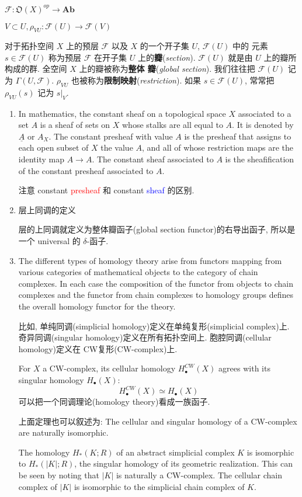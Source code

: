 \documentclass{ctexart}
\newcommand{\F}{\mathscr{F}}
\newcommand{\NBR}[1]{\mathfrak{O}(#1)}
\begin{document}
$\F \colon \NBR{X}^{op} \to \mathbf{A\!b}$

$V \subset U, \rho_{VU} : \F(U) \to \F(V)$

对于拓扑空间 $X$ 上的预层 $\F$ 以及 $X$ 的一个开子集 $U$, $\F(U)$ 中的
元素 $s \in \F(U)$ 称为预层 $\F$ 在开子集 $U$ 上的\textbf{瓣}(\textit{section}). $\F(U)$
就是由 $U$ 上的瓣所构成的群. 全空间 $X$ 上的瓣被称为\textbf{整体
  瓣}(\textit{global section}). 我们往往把 $\F(U)$ 记为 $\Gamma(U,
\F)$. $\rho_{VU}$ 也被称为\textbf{限制映射}(\textit{restriction}). 如果 $s \in
\F(U)$, 常常把 $\rho_{VU}(s)$ 记为 $s|_{V}$.

\begin{enumerate}
\item In mathematics, the constant sheaf on a topological space $X$ associated to a set $A$ is a sheaf of sets on $X$ whose stalks are all equal to $A$. It is denoted by $\underline{A}$ or $A_X$. The constant presheaf with value $A$ is the presheaf that assigns to each open subset of $X$ the value $A$, and all of whose restriction maps are the identity map $A\to A$. The constant sheaf associated to $A$ is the sheafification of the constant presheaf associated to $A$.\cite{constant_sheaf}

    注意 constant \textcolor{red}{presheaf} 和 constant \textcolor{blue}{sheaf} 的区别.

\item 层上同调的定义

层的上同调就定义为整体瓣函子(global section functor)的右导出函子, 所以是一个 universal 的 $\delta$-函子.

\item The different types of homology theory arise from functors mapping from various categories of mathematical objects to the category of chain complexes. In each case the composition of the functor from objects to chain complexes and the functor from chain complexes to homology groups defines the overall homology functor for the theory.

比如, 单纯同调(simplicial homology)定义在单纯复形(simplicial complex)上. 奇异同调(singular homology)定义在所有拓扑空间上. 胞腔同调(cellular homology)定义在 CW复形(CW-complex)上.

For $X$ a CW-complex, its cellular homology $H^{CW}_\bullet(X)$ agrees with its singular homology $H_\bullet(X)$:
\[
H^{CW}_\bullet(X)\simeq H_\bullet(X)
\]
可以把一个同调理论(homology theory)看成一族函子.

上面定理也可以叙述为: The cellular and singular homology of a CW-complex are naturally isomorphic.

The homology $H_\ast(K;R)$ of an abstract simplicial complex $K$ is isomorphic to $H_\ast(\left|K\right|;R)$, the singular homology of its geometric realization. This can be seen by noting that $\left|K\right|$ is naturally a CW-complex. The cellular chain complex of $\left|K\right|$ is isomorphic to the simplicial chain complex of $K$.
\end{enumerate}

\newpage
\printbibliography
\end{document}
